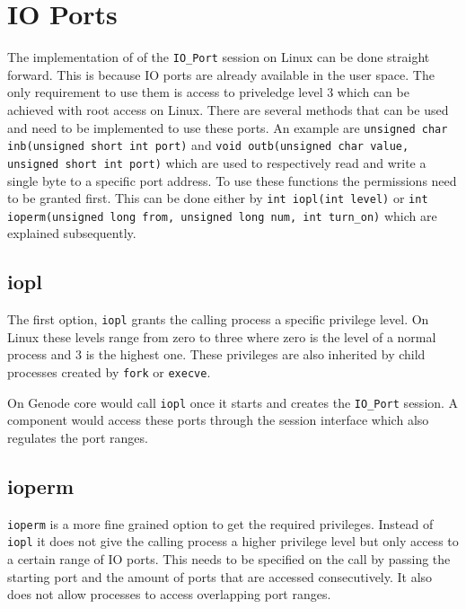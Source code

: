 \documentclass[
a4paper,
12pt,
notitlepage,
parskip=half,
DIV=11,
]{scrbook}
\begin{document}
		\section{IO Ports}
		
		The implementation of of the \texttt{IO\_Port} session on Linux can be done straight forward.
		This is because IO ports are already available in the user space.
		The only requirement to use them is access to priveledge level 3 which can be achieved with root access on Linux.
		There are several methods that can be used and need to be implemented to use these ports.
		An example are \texttt{unsigned char inb(unsigned short int port)} and \texttt{void outb(unsigned char value, unsigned short int port)} which are used to respectively read and write a single byte to a specific port address.
		To use these functions the permissions need to be granted first.
		This can be done either by \texttt{int iopl(int level)} or \texttt{int ioperm(unsigned long from, unsigned long num, int turn\_on)} which are explained subsequently. \citep{outb} \citep{ioperm} \citep{iopl}
				
		\subsection{iopl}
		
		The first option, \texttt{iopl} grants the calling process a specific privilege level.
		On Linux these levels range from zero to three where zero is the level of a normal process and 3 is the highest one.
		These privileges are also inherited by child processes created by \texttt{fork} or \texttt{execve}. \citep{iopl}
		
		On Genode core would call \texttt{iopl} once it starts and creates the \texttt{IO\_Port} session.
		A component would access these ports through the session interface which also regulates the port ranges.
		
		\subsection{ioperm}
		
		\texttt{ioperm} is a more fine grained option to get the required privileges.
		Instead of \texttt{iopl} it does not give the calling process a higher privilege level but only access to a certain range of IO ports.
		This needs to be specified on the call by passing the starting port and the amount of ports that are accessed consecutively.
		It also does not allow processes to access overlapping port ranges. \citep{ioperm}
		
\end{document}
